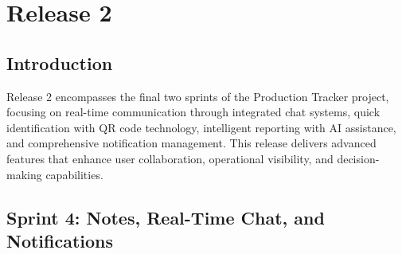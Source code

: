\chapter{Release 2}
\label{chap:release2}

\section{Introduction}
\label{sec:release2-intro}

Release 2 encompasses the final two sprints of the Production Tracker project, focusing on real-time communication through integrated chat systems, quick identification with QR code technology, intelligent reporting with AI assistance, and comprehensive notification management. This release delivers advanced features that enhance user collaboration, operational visibility, and decision-making capabilities.

\section{Sprint 4: Notes, Real-Time Chat, and Notifications}
\label{sec:sprint4}


